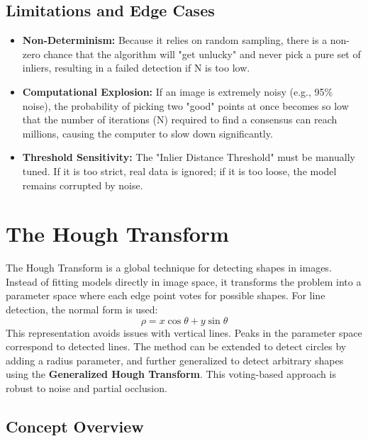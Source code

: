 \documentclass[12pt]{article}
\begin{document}
\subsection{Limitations and Edge Cases}

\begin{itemize}
    \item \textbf{Non-Determinism:} Because it relies on random sampling, there is a non-zero chance that the algorithm will "get unlucky" and never pick a pure set of inliers, resulting in a failed detection if N is too low.

    \item \textbf{Computational Explosion:} If an image is extremely noisy (e.g., 95\% noise), the probability of picking two "good" points at once becomes so low that the number of iterations (N) required to find a consensus can reach millions, causing the computer to slow down significantly.

    \item \textbf{Threshold Sensitivity:} The "Inlier Distance Threshold" must be manually tuned. If it is too strict, real data is ignored; if it is too loose, the model remains corrupted by noise.
\end{itemize}

\section{The Hough Transform}
The Hough Transform is a global technique for detecting shapes in images. Instead of fitting models directly in image space, it transforms the problem into a parameter space where each edge point votes for possible shapes. For line detection, the normal form is used:
\[
    \rho = x \cos \theta + y \sin \theta
\]
This representation avoids issues with vertical lines. Peaks in the parameter space correspond to detected lines. The method can be extended to detect circles by adding a radius parameter, and further generalized to detect arbitrary shapes using the \textbf{Generalized Hough Transform}. This voting-based approach is robust to noise and partial occlusion.

\subsection{Concept Overview}
\end{document}
